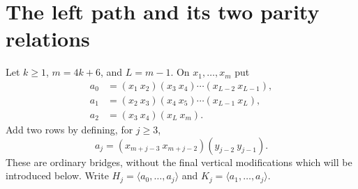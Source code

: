 \documentclass[11pt]{article}
\newcommand{\gen}[1]{\langle#1\rangle}
\begin{document}
\section{The left path and its two parity relations}
Let $k\ge1$, $m=4k+6$, and $L=m-1$. On $x_1,\ldots,x_m$ put
\begin{align*}
 a_0&=(x_1\ x_2)(x_3\ x_4)\cdots(x_{L-2}\ x_{L-1}),\\
 a_1&=(x_2\ x_3)(x_4\ x_5)\cdots(x_{L-1}\ x_L),\\
 a_2&=(x_3\ x_4)(x_L\ x_m).
\end{align*}
Add two rows by defining, for $j\ge3$,
\begin{equation}\label{bridges}
 a_j=(x_{m+j-3}\ x_{m+j-2})(y_{j-2}\ y_{j-1}).
\end{equation}
These are ordinary bridges, without the final vertical modifications
which will be introduced below. Write $H_j=\gen{a_0,\ldots,a_j}$
and $K_j=\gen{a_1,\ldots,a_j}$.
\end{document}
